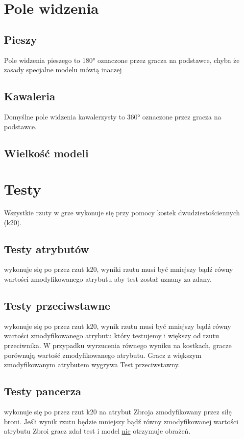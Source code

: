 \section{Pole widzenia}

\subsection{Pieszy}
Pole widzenia pieszego to \ang{180} oznaczone przez gracza na podstawce, chyba że zasady specjalne modelu mówią inaczej

\subsection{Kawaleria}
Domyślne pole widzenia kawalerzysty to \ang{360} oznaczone przez gracza na podstawce. 

\subsection{Wielkość modeli}

\section{Testy}

Wszystkie rzuty w grze wykonuje się przy pomocy kostek dwudziestościennych (k20).

\subsection{Testy atrybutów} wykonuje się po przez rzut k20, wyniki rzutu musi być mniejszy bądź równy wartości zmodyfikowanego atrybutu aby test został uznany za zdany. 

\subsection{Testy przeciwstawne} wykonuje się po przez rzut k20, wynik rzutu musi być mniejszy bądź równy wartości zmodyfikowanego atrybutu który testujemy i większy od rzutu przeciwnika. W przypadku wyrzucenia równego wyniku na kostkach, gracze porównują wartość zmodyfikowanego atrybutu. Gracz z większym zmodyfikowanym atrybutem wygrywa Test przeciwstawny. 
\subsection{Testy pancerza} wykonuje się po przez rzut k20 na atrybut Zbroja zmodyfikowany przez siłę broni. Jeśli wynik rzutu będzie mniejszy bądź równy zmodyfikowanej wartości atrybutu Zbroi gracz zdał test i model \underline{nie} otrzymuje obrażeń.



